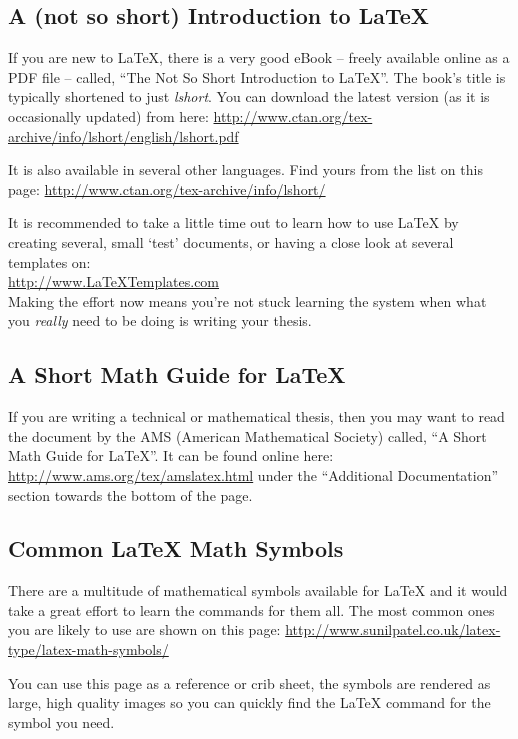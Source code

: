 \documentclass[
12pt, %
english, %
doublespacing, %
nolistspacing, %
liststotoc, %
headsepline, %
chapterinoneline, %
openany, %
]{DoctoralThesis}\usepackage[]{graphicx}\usepackage[]{color}
\begin{document}
\subsection{A (not so short) Introduction to \LaTeX{}}

If you are new to \LaTeX{}, there is a very good eBook -- freely available online as a PDF file -- called, \enquote{The Not So Short Introduction to \LaTeX{}}. The book's title is typically shortened to just \emph{lshort}. You can download the latest version (as it is occasionally updated) from here:
\url{http://www.ctan.org/tex-archive/info/lshort/english/lshort.pdf}

It is also available in several other languages. Find yours from the list on this page: \url{http://www.ctan.org/tex-archive/info/lshort/}

It is recommended to take a little time out to learn how to use \LaTeX{} by creating several, small `test' documents, or having a close look at several templates on:\\ 
\url{http://www.LaTeXTemplates.com}\\ 
Making the effort now means you're not stuck learning the system when what you \emph{really} need to be doing is writing your thesis.

\subsection{A Short Math Guide for \LaTeX{}}

If you are writing a technical or mathematical thesis, then you may want to read the document by the AMS (American Mathematical Society) called, \enquote{A Short Math Guide for \LaTeX{}}. It can be found online here:
\url{http://www.ams.org/tex/amslatex.html}
under the \enquote{Additional Documentation} section towards the bottom of the page.

\subsection{Common \LaTeX{} Math Symbols}
There are a multitude of mathematical symbols available for \LaTeX{} and it would take a great effort to learn the commands for them all. The most common ones you are likely to use are shown on this page:
\url{http://www.sunilpatel.co.uk/latex-type/latex-math-symbols/}

You can use this page as a reference or crib sheet, the symbols are rendered as large, high quality images so you can quickly find the \LaTeX{} command for the symbol you need.
\end{document}
